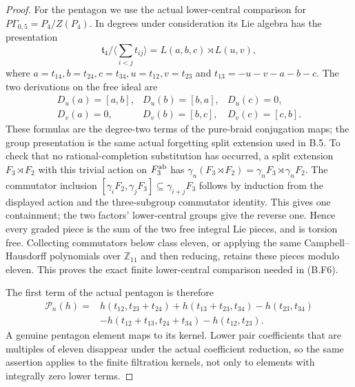 \begin{proof}
For the pentagon we use the actual lower-central comparison
for $P\Gamma_{0,5}=P_4/Z(P_4)$. In degrees under consideration
its Lie algebra has the presentation
\[
 \mathfrak t_4/\langle\textstyle\sum_{i<j}t_{ij}\rangle
       =L(a,b,c)\rtimes L(u,v),                            \tag{B.F6}
\]
where $a=t_{14},b=t_{24},c=t_{34},u=t_{12},v=t_{23}$ and
$t_{13}=-u-v-a-b-c$. The two derivations on the free ideal are
\[
\begin{array}{lll}
 D_u(a)=[a,b],&D_u(b)=[b,a],&D_u(c)=0,\\
 D_v(a)=0,&D_v(b)=[b,c],&D_v(c)=[c,b].
\end{array}                                                \tag{B.F7}
\]
These formulas are the degree-two terms of the pure-braid
conjugation maps; the group presentation is the same actual
forgetting split extension used in B.5. To check that no
rational-completion substitution has occurred, a split extension
$F_3\rtimes F_2$ with this trivial action on $F_3^{\rm ab}$
has
$\gamma_n(F_3\rtimes F_2)=\gamma_nF_3\rtimes\gamma_nF_2$.
The commutator inclusion
$[\gamma_iF_2,\gamma_jF_3]\subseteq\gamma_{i+j}F_3$
follows by induction from the displayed action and the
three-subgroup commutator identity. This gives one containment;
the two factors' lower-central groups give the reverse one.
Hence every graded piece is the sum of the two free integral
Lie pieces, and is torsion free. Collecting commutators below
class eleven, or applying the same Campbell--Hausdorff
polynomials over $\mathbb Z_{11}$ and then reducing, retains
these pieces modulo eleven. This proves the exact finite
lower-central comparison needed in (B.F6).

The first term of the actual pentagon is therefore
\[
\begin{aligned}
 \mathcal P_n(h)={}&h(t_{12},t_{23}+t_{24})
       +h(t_{13}+t_{23},t_{34})-h(t_{23},t_{34})\\
       &-h(t_{12}+t_{13},t_{24}+t_{34})-h(t_{12},t_{23}).
\end{aligned}                                               \tag{B.F8}
\]
A genuine pentagon element maps to its kernel. Lower pair
coefficients that are multiples of eleven disappear under the
actual coefficient reduction, so the same assertion applies
to the finite filtration kernels, not only to elements with
integrally zero lower terms.


\end{proof}
